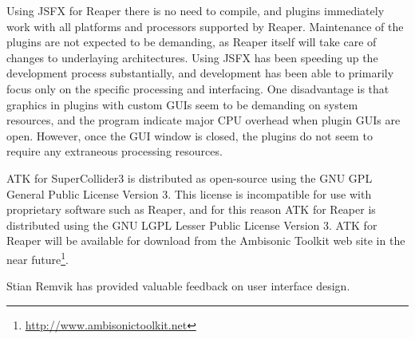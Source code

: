 \documentclass{article}
\begin{document}
Using JSFX for Reaper there is no need to compile, and plugins immediately work with all platforms and processors supported by Reaper.
Maintenance of the plugins are not expected to be demanding, as Reaper itself will take care of changes to underlaying architectures.
Using JSFX has been speeding up the development process substantially, and development has been able to primarily focus only on the specific processing and interfacing.
One disadvantage is that graphics in plugins with custom GUIs seem to be demanding on system resources, and the program indicate major CPU overhead when plugin GUIs are open.
However, once the GUI window is closed, the plugins do not seem to require any extraneous processing resources.

ATK for SuperCollider3 is distributed as open-source using the GNU GPL General Public License Version 3.
This license is incompatible for use with proprietary software such as Reaper, and for this reason ATK for Reaper is distributed using the GNU LGPL Lesser Public License Version 3.
ATK for Reaper will be available for download from the Ambisonic Toolkit web site in the near future\footnote{\href{http://www.ambisonictoolkit.net}{http://www.ambisonictoolkit.net}}.


\begin{acknowledgments}
Stian Remvik has provided valuable feedback on user interface design.
\end{acknowledgments} 


\end{document}
